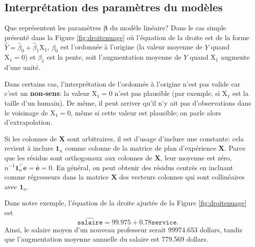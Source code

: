 \documentclass[
  11pt,
  letterpaper,
]{article}
\theoremstyle{definition}
\theoremstyle{definition}
\theoremstyle{definition}
\theoremstyle{remark}
\begin{document}
\hypertarget{interpruxe9tation-des-paramuxe8tres-du-moduxe8les}{%
\subsection{Interprétation des paramètres du modèles}\label{interpruxe9tation-des-paramuxe8tres-du-moduxe8les}}

Que représentent les paramètres \(\boldsymbol{\beta}\) du modèle linéaire? Dans le cas simple présenté dans la Figure \ref{fig:droitenuage} où l'équation de la droite est de la forme \(\widehat{Y} = \widehat{\beta}_0 + \widehat{\beta}_1\mathrm{X}_1\), \(\beta_0\) est l'ordonnée à l'origine (la valeur moyenne de \(Y\) quand \(\mathrm{X}_1=0\)) et \(\beta_1\) est la pente, soit l'augmentation moyenne de \(Y\) quand \(\mathrm{X}_1\) augmente d'une unité.

Dans certains cas, l'interprétation de l'ordonnée à l'origine n'est pas valide car c'est un \textbf{non-sens}: la valeur \(\mathrm{X}_1=0\) n'est pas plausible (par exemple, si \(\mathrm{X}_1\) est la taille d'un humain). De même, il peut arriver qu'il n'y ait pas d'observations dans le voisinage de \(\mathrm{X}_1=0\), même si cette valeur est plausible; on parle alors d'extrapolation.

Si les colonnes de \(\mathbf{X}\) sont arbitraires, il est d'usage d'inclure une constante: cela revient à inclure \(\mathbf{1}_n\) comme colonne de la matrice de plan d'expérience \(\mathbf{X}\). Parce que les résidus sont orthogonaux aux colonnes de \(\mathbf{X}\), leur moyenne est zéro, \(n^{-1}\mathbf{1}_n^\top\boldsymbol{e}=\bar{\boldsymbol{e}}=0\). En général, on peut obtenir des résidus centrés en incluant comme régresseurs dans la matrice \(\mathbf{X}\) des vecteurs colonnes qui sont collinéaires avec \(\mathbf{1}_n\).

Dans notre exemple, l'équation de la droite ajustée de la Figure \ref{fig:droitenuage} est \[\widehat{\texttt{salaire}} = 99.975 + 0.78\texttt{service}.\]
Ainsi, le salaire moyen d'un nouveau professeur serait 99974.653 dollars, tandis que l'augmentation moyenne annuelle du salaire est 779.569 dollars.
\end{document}
